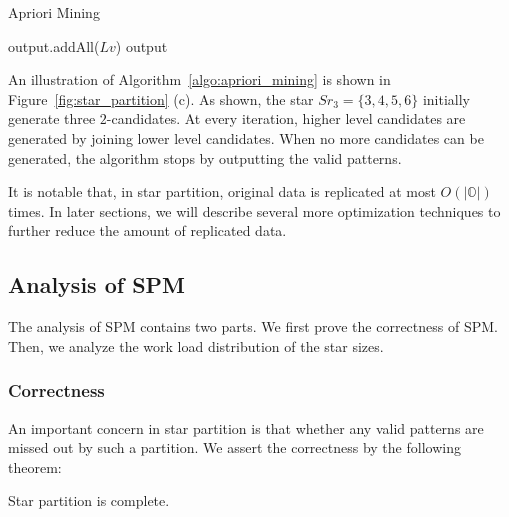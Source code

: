 \begin{algorithm}
\caption{Apriori Mining}
\label{algo:apriori_mining}
\begin{algorithmic}[1]
 
\EndFor
{}
			 
		\EndIf
\EndWhile
\State output.addAll($Lv$)
\State \Return output
\end{algorithmic}
\end{algorithm}
 
An illustration of Algorithm~\ref{algo:apriori_mining} is shown in Figure~\ref{fig:star_partition} (c).
As shown, the star $Sr_3=\{3,4,5,6\}$ initially generate three $2$-candidates. At every iteration, 
higher level candidates are generated by joining lower level candidates. When no more candidates 
can be generated, the algorithm stops by outputting the valid patterns.

It is notable that, in star partition, original data is 
replicated at most $O(|\mathbb{O}|)$ times.
In later sections, we will describe several 
more optimization techniques to further reduce the amount of replicated data.

\subsection{Analysis of SPM}
The analysis of SPM contains two parts. We first prove the correctness
of SPM. Then, we analyze the work load distribution of the star sizes.

\subsubsection{Correctness}
An important concern in star partition is that
whether any valid patterns are missed out by 
such a partition. We assert the correctness by 
the following theorem:
\begin{theorem}
\label{THM:SPM_CORRECT}
Star partition is complete.
\end{theorem}

